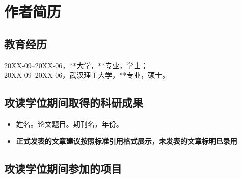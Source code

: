 \chapter{作者简历}

\section*{教育经历}
\noindent 20XX-09--20XX-06，**大学，**专业，学士；\\
20XX-09--20XX-06，武汉理工大学，**专业，硕士。

\section*{攻读学位期间取得的科研成果}
\begin{itemize}[nosep]
  \item 姓名。论文题目。期刊名，年份。
  \item \textbf{正式发表的文章建议按照标准引用格式展示，未发表的文章标明已录用}
\end{itemize}

\section*{攻读学位期间参加的项目}